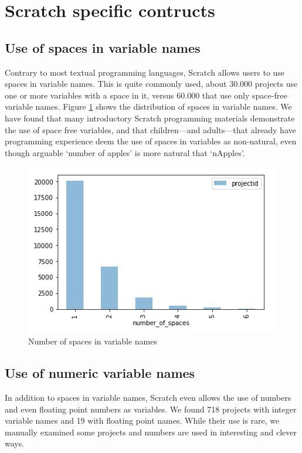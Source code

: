 \documentclass[conference]{IEEEtran}
\begin{document}
\section{Scratch specific contructs}



\subsection{Use of spaces in variable names}

Contrary to most textual programming languages, Scratch allows users to use spaces in variable names. This is quite commonly used, about 30.000 projects use one or more variables with a space in it, versus 60.000 that use only space-free variable names. Figure \ref{fig:number_of_spaces} shows the distribution of spaces in variable names. We have found that many introductory Scratch programming materials demonstrate the use of space free variables, and that children---and adults---that already have programming experience deem the use of spaces in variables as non-natural, even though arguable `number of apples' is more natural that `nApples'.

\begin{figure}
	\begin{center}
		\includegraphics[width=\columnwidth]{fig/number_of_spaces}
		\caption{Number of spaces in variable names}
		\label{fig:number_of_spaces}
	\end{center}
\end{figure} 

\subsection{Use of numeric variable names}
In addition to spaces in variable names, Scratch even allows the use of numbers and even floating point numbers as variables. We found 718 projects with integer variable names and 19 with floating point names. While their use is rare, we manually examined some projects and numbers are used in interesting and clever ways.
\end{document}
